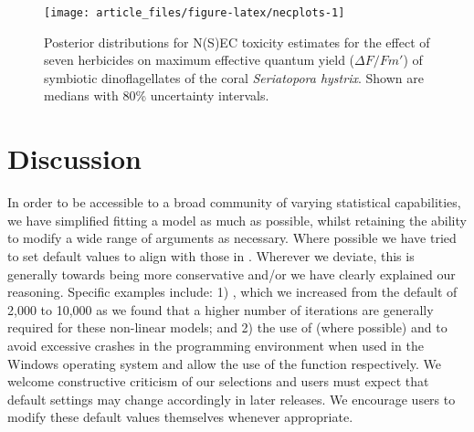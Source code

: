 \documentclass[
  shortnames]{jss}
\begin{document}
\begin{CodeChunk}
\begin{figure}[!ht]

{\centering \texttt{[image: article\_files/figure-latex/necplots-1]} 

}

\caption[Posterior distributions for N(S)EC toxicity estimates for the effect of seven herbicides on maximum effective quantum yield ($\Delta F / Fm'$) of symbiotic dinoflagellates of the coral \textit{Seriatopora hystrix}]{Posterior distributions for N(S)EC toxicity estimates for the effect of seven herbicides on maximum effective quantum yield ($\Delta F / Fm'$) of symbiotic dinoflagellates of the coral \textit{Seriatopora hystrix}. Shown are medians with 80\% uncertainty intervals.}\label{fig:necplots}
\end{figure}
\end{CodeChunk}

\hypertarget{discussion}{%
\section{Discussion}\label{discussion}}

In order to be accessible to a broad community of varying statistical capabilities, we have simplified fitting a  model as much as possible, whilst retaining the ability to modify a wide range of arguments as necessary. Where possible we have tried to set default values to align with those in . Wherever we deviate, this is generally towards being more conservative and/or we have clearly explained our reasoning. Specific examples include: 1) , which we increased from the  default of 2,000 to 10,000 as we found that a higher number of iterations are generally required for these non-linear models; and 2) the use of  (where possible) and  to avoid excessive crashes in the  programming environment when used in the Windows operating system and allow the use of the  function respectively. We welcome constructive criticism of our selections and users must expect that default settings may change accordingly in later releases. We encourage users to modify these default values themselves whenever appropriate.
\end{document}
